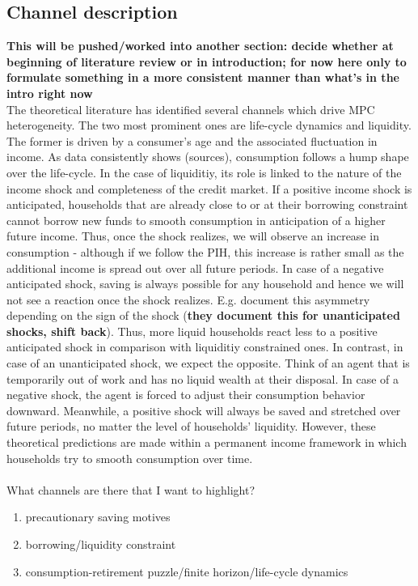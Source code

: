 \subsection{Channel description}
\textbf{This will be pushed/worked into another section: decide whether at beginning of literature review or in introduction; for now here only to formulate something in a more consistent manner than what's in the intro right now} \\
The theoretical literature has identified several channels which drive MPC heterogeneity. The two most prominent ones are life-cycle dynamics and liquidity. The former is driven by a consumer's age and the associated fluctuation in income. As data consistently shows (sources), consumption follows a hump shape over the life-cycle. In the case of liquiditiy, its role is linked to the nature of the income shock and completeness of the credit market. If a positive income shock is anticipated, households that are already close to or at their borrowing constraint cannot borrow new funds to smooth consumption in anticipation of a higher future income. Thus, once the shock realizes, we will observe an increase in consumption - although if we follow the PIH, this increase is rather small as the additional income is spread out over all future periods. In case of a negative anticipated shock, saving is always possible for any household and hence we will not see a reaction once the shock realizes. E.g. \cite{bunn_etal} document this asymmetry depending on the sign of the shock (\textbf{they document this for unanticipated shocks, shift back}). Thus, more liquid households react less to a positive anticipated shock in comparison with liquiditiy constrained ones. In contrast, in case of an unanticipated shock, we expect the opposite. Think of an agent that is temporarily out of work and has no liquid wealth at their disposal. In case of a negative shock, the agent is forced to adjust their consumption behavior downward. Meanwhile, a positive shock will always be saved and stretched over future periods, no matter the level of households' liquidity. However, these theoretical predictions are made within a permanent income framework in which households try to smooth consumption over time.\\ 
\\
What channels are there that I want to highlight? 
\begin{enumerate}
    \item precautionary saving motives
    \item borrowing/liquidity constraint
    \item consumption-retirement puzzle/finite horizon/life-cycle dynamics
\end{enumerate}